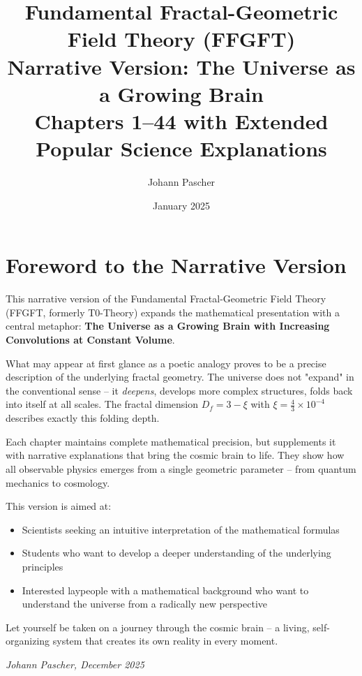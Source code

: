 \documentclass[11pt,openright,twoside]{book}
\title{%
	\textbf{Fundamental Fractal-Geometric Field Theory (FFGFT)} \\
	\Large Narrative Version: The Universe as a Growing Brain \\
	\normalsize Chapters 1--44 with Extended Popular Science Explanations
}
\author{Johann Pascher}
\date{January 2025}
\begin{document}
\maketitle

\tableofcontents



\chapter*{Foreword to the Narrative Version}

This narrative version of the Fundamental Fractal-Geometric Field Theory (FFGFT, formerly T0-Theory) expands the mathematical presentation with a central metaphor: \textbf{The Universe as a Growing Brain with Increasing Convolutions at Constant Volume}.

What may appear at first glance as a poetic analogy proves to be a precise description of the underlying fractal geometry. The universe does not "expand" in the conventional sense – it \textit{deepens}, develops more complex structures, folds back into itself at all scales. The fractal dimension $D_f = 3 - \xi$ with $\xi = \frac{4}{3} \times 10^{-4}$ describes exactly this folding depth.

Each chapter maintains complete mathematical precision, but supplements it with narrative explanations that bring the cosmic brain to life. They show how all observable physics emerges from a single geometric parameter – from quantum mechanics to cosmology.

This version is aimed at:
\begin{itemize}
	\item Scientists seeking an intuitive interpretation of the mathematical formulas
	\item Students who want to develop a deeper understanding of the underlying principles
	\item Interested laypeople with a mathematical background who want to understand the universe from a radically new perspective
\end{itemize}

Let yourself be taken on a journey through the cosmic brain – a living, self-organizing system that creates its own reality in every moment.

\vfill
\textit{Johann Pascher, December 2025}

\newpage
\end{document}
